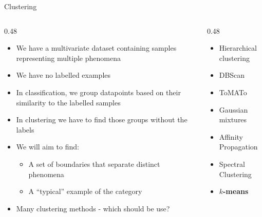 \documentclass[aspectratio=169]{beamer}
\begin{document}
\begin{frame}{Clustering}
  \begin{columns}[T]
    \begin{column}{0.48\textwidth}
      \begin{itemize}
        \item We have a multivariate dataset containing samples representing multiple phenomena
        \item We have no labelled examples
        \item In classification, we group datapoints based on their similarity to the labelled samples
        \item In clustering we have to find those groups without the labels
        \item We will aim to find:
        \begin{itemize}
          \item A set of boundaries that separate distinct phenomena
          \item A ``typical'' example of the category
        \end{itemize}
        \item Many clustering methods - which should be use?
      \end{itemize}
    \end{column}
    \pause
    \begin{column}{0.48\textwidth}
      \begin{itemize}
        \item Hierarchical clustering
        \item DBScan
        \item ToMATo
        \item Gaussian mixtures
        \item Affinity Propagation
        \item Spectral Clustering
        \pause
        \item \textbf{$k$-means}
      \end{itemize}
    \end{column}
  \end{columns}
\end{frame}
\end{document}
